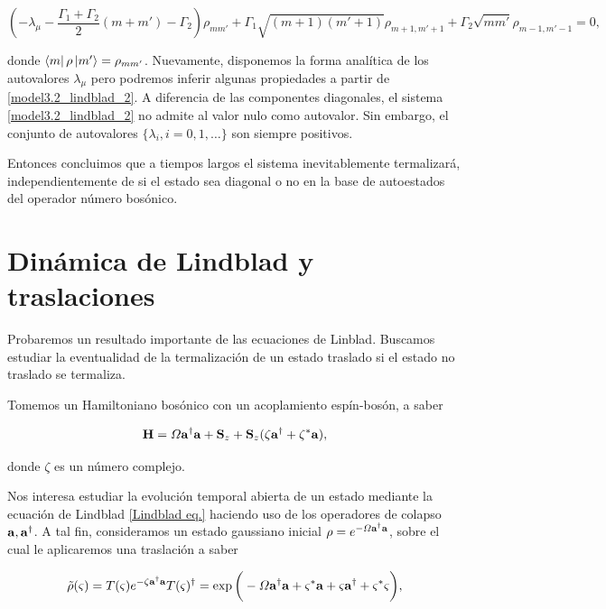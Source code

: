 \documentclass{report} %
\numberwithin{equation}{section}
\begin{document}
\begin{equation}
    \left(-\lambda_{\mu}- \frac{\Gamma_1+\Gamma_2}{2}(m+m') - \Gamma_2\right)\rho_{mm'} + \Gamma_1\sqrt{(m+1)(m'+1)}\rho_{m+1,m'+1} + \Gamma_2 \sqrt{mm'}\rho_{m-1,m'-1} = 0,
    \label{model3.2_lindblad_2}
\end{equation}

donde $\bra{m}\rho\ket{m'} = \rho_{mm'}$. Nuevamente, disponemos la forma analítica de los autovalores $\lambda_\mu$ pero podremos inferir algunas propiedades a partir de \eqref{model3.2_lindblad_2}. A diferencia de las componentes diagonales, el sistema \eqref{model3.2_lindblad_2} no admite al valor nulo como autovalor. Sin embargo, el conjunto de autovalores $\{\lambda_i, i = 0,1,\ldots\}$ son siempre positivos.

Entonces concluimos que a tiempos largos el sistema inevitablemente termalizará, independientemente de si el estado sea diagonal o no en la base de autoestados del operador número bosónico. 

\section{Din\'amica de Lindblad y traslaciones}

Probaremos un resultado importante de las ecuaciones de Linblad. Buscamos estudiar la eventualidad de la termalización de un estado traslado si el estado no traslado se termaliza.

Tomemos un Hamiltoniano bosónico con un acoplamiento espín-bosón, a saber

\begin{equation}
    {\bf H} = \Omega {\bf a}^{\dagger}{\bf a} + {\bf S}_z + {\bf S}_z (\zeta {\bf a}^{\dagger} + \zeta^* {\bf a}), 
    \label{model3.3_hamiltonian}
\end{equation}

donde $\zeta$ es un número complejo. 

Nos interesa estudiar la evolución temporal abierta de un estado mediante la ecuación de Lindblad \eqref{Lindblad eq.} haciendo uso de los operadores de colapso ${\bf a}, {\bf a}^{\dagger}$. A tal fin, consideramos un estado gaussiano inicial $\rho = e^{- \Omega {\bf a}^{\dagger} {\bf a}}$, sobre el cual le aplicaremos una traslación a saber

\begin{equation}
    \tilde{\rho} (\varsigma) =  T(\varsigma) e^{-\zeta {\bf a}^{\dagger}{\bf a}} T(\varsigma)^{\dagger} = \exp\bigg(-\Omega {\bf a}^{\dagger}{\bf a} +\varsigma^{*} {\bf a} +\varsigma {\bf a}^{\dagger} + \varsigma^{*}\varsigma\bigg),
    \label{model 1 translated rho}
\end{equation}
\end{document}
